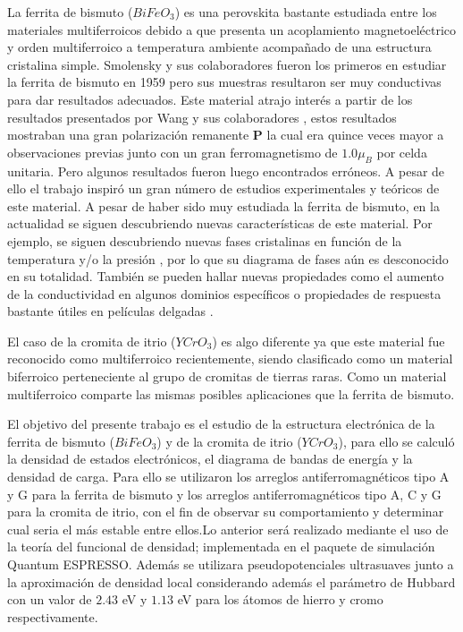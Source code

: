 \noindent La ferrita de bismuto ($BiFeO_{3}$) es una perovskita bastante estudiada entre los materiales multiferroicos debido a que presenta un acoplamiento magnetoel\'ectrico y orden multiferroico a temperatura ambiente acompa\~nado de una estructura cristalina simple. Smolensky y sus colaboradores fueron los primeros en estudiar la ferrita de bismuto en 1959 pero sus muestras resultaron ser muy conductivas para dar resultados adecuados. Este material atrajo inter\'es a partir de los resultados presentados por Wang y sus colaboradores \cite{wang2003}, estos resultados mostraban una gran polarizaci\'on remanente {\bf P} la cual era quince veces mayor a observaciones previas junto con un gran ferromagnetismo de $1.0 \mu _{B}$ por celda unitaria. Pero algunos resultados fueron luego encontrados err\'oneos. A pesar de ello el trabajo inspir\'o un gran n\'umero de estudios experimentales y te\'oricos de este material. A pesar de haber sido muy estudiada la ferrita de bismuto, en la actualidad se siguen descubriendo nuevas caracter\'isticas de este material. Por ejemplo, se siguen descubriendo nuevas fases cristalinas en funci\'on de la temperatura y/o la presi\'on \cite{teague1970,koumpouras2011}, por lo que su diagrama de fases a\'un es desconocido en su totalidad. Tambi\'en se pueden hallar nuevas propiedades como el aumento de la conductividad en algunos dominios espec\'ificos \cite{ravindram2006} o propiedades de respuesta bastante \'utiles en pel\'iculas delgadas \cite{spaldin2005}.


\noindent El caso de la cromita de itrio ($YCrO_{3}$) es algo diferente ya que este material fue reconocido como multiferroico recientemente, siendo clasificado como un material biferroico perteneciente al grupo de cromitas de tierras raras. Como un material multiferroico comparte las mismas posibles aplicaciones que la ferrita de bismuto.


\noindent El objetivo del presente trabajo es el estudio de la estructura 
electr\'onica de la ferrita de bismuto ($BiFeO_{3}$) y de la cromita de itrio ($YCrO_{3}$), para ello se calcul\'o la densidad de estados
electr\'onicos, el diagrama de bandas de energ\'ia y la densidad de carga. Para 
ello se utilizaron los arreglos antiferromagn\'eticos tipo A y G para la ferrita de bismuto y los arreglos antiferromagn\'eticos tipo A, C y G para la cromita de itrio, con el fin de observar su comportamiento y determinar cual seria el m\'as estable entre ellos.Lo anterior ser\'a realizado mediante el uso de la teor\'ia del funcional de densidad; implementada en el paquete de simulaci\'on Quantum ESPRESSO. Adem\'as se utilizara pseudopotenciales ultrasuaves junto a la aproximaci\'on de densidad local considerando adem\'as el par\'ametro de Hubbard con un valor de $2.43$ eV y $1.13$ eV para los \'atomos de hierro y cromo respectivamente.
